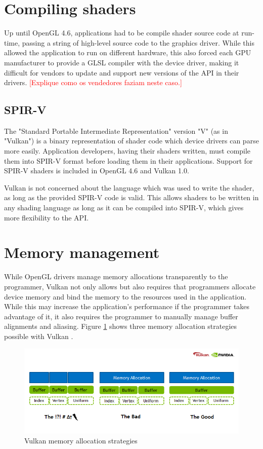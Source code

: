 \section{Compiling shaders}
Up until OpenGL 4.6, applications had to be compile shader source code at run-time, passing a string of high-level source code to the graphics driver. While this allowed the application to run on different hardware, this also forced each GPU manufacturer to provide a GLSL compiler with the device driver, making it difficult for vendors to update and support new versions of the API in their drivers.
\textcolor{red}{[Explique como os vendedores faziam neste caso.]}

\subsection{SPIR-V}
The "Standard Portable Intermediate Representation" version "V" (as in "Vulkan") is a binary representation of shader code which device drivers can parse more easily. Application developers, having their shaders written, must compile them into SPIR-V format before loading them in their applications. Support for SPIR-V shaders is included in OpenGL 4.6 and Vulkan 1.0.

Vulkan is not concerned about the language which was used to write the shader, as long as the provided SPIR-V code is valid. This allows shaders to be written in any shading language as long as it can be compiled into SPIR-V, which gives more flexibility to the API.

\section{Memory management}
While OpenGL drivers manage memory allocations transparently to the programmer, Vulkan not only allows but also requires that programmers allocate device memory and bind the memory to the resources used in the application. While this may increase the application's performance if the programmer takes advantage of it, it also requires the programmer to manually manage buffer alignments and aliasing. Figure \ref{fig:vulkan_mem_alloc} shows three memory allocation strategies possible with Vulkan \cite{vulkan_mem_mgmt}.

\begin{figure}[ht]
    \caption{Vulkan memory allocation strategies}
    \begin{center}
        \includegraphics[width = 15cm]{figs/vulkan_memory_strategy.png}
    \end{center}
    \label{fig:vulkan_mem_alloc}
\end{figure}

